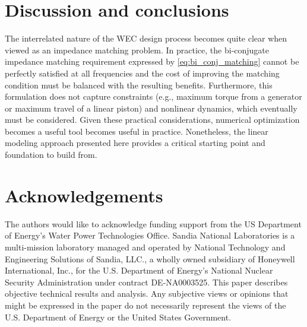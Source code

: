 \documentclass[lettersize,journal]{IEEEtran}
\begin{document}
{%
\section{Discussion and conclusions}
The interrelated nature of the WEC design process becomes quite clear when viewed as an impedance matching problem.
In practice, the bi-conjugate impedance matching requirement expressed by \eqref{eq:bi_conj_matching} cannot be perfectly satisfied at all frequencies and the cost of improving the matching condition must be balanced with the resulting benefits.
Furthermore, this formulation does not capture constraints (e.g., maximum torque from a generator or maximum travel of a linear piston) and nonlinear dynamics, which eventually must be considered.
Given these practical considerations, numerical optimization becomes a useful tool becomes useful in practice.
Nonetheless, the linear modeling approach presented here provides a critical starting point and foundation to build from.

\section{Acknowledgements}
The authors would like to acknowledge funding support from the US Department of Energy's Water Power Technologies Office.
Sandia National Laboratories is a multi-mission laboratory managed and operated by National Technology and Engineering Solutions of Sandia, LLC., a wholly owned subsidiary of Honeywell International, Inc., for the U.S. Department of Energy's National Nuclear Security Administration under contract DE-NA0003525.
This paper describes objective technical results and analysis.
Any subjective views or opinions that might be expressed in the paper do not necessarily represent the views of the U.S. Department of Energy or the United States Government.





}
\end{document}
